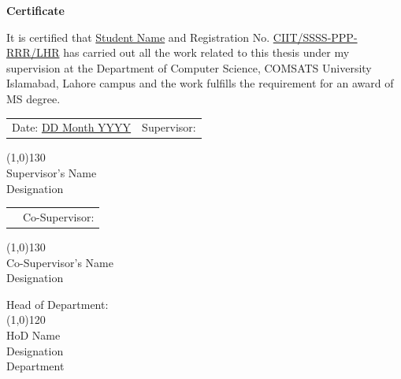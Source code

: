 \begin{titlepage}
\begin{center}
	\vspace{1cm }
	\textbf{\large Certificate}\\
\end{center}
\justify
It is certified that \underline{Student Name} and Registration No. \underline{CIIT/SSSS-PPP-RRR/LHR} has
carried out all the work related to this thesis under my supervision at the Department of Computer Science, COMSATS University Islamabad, Lahore campus and the work fulfills the requirement for an award of MS degree.\\

\vspace{1cm}
\begin{table}[ht!]
	\begin{tabularx}{\textwidth}{p{10cm} p{6cm}}
		Date: \underline{DD Month YYYY} & Supervisor: \\
	\end{tabularx}
\end{table}


\vspace{1cm }
\raggedleft \line(1,0){130} \\
\vspace{0.1cm }
\raggedleft Supervisor's Name \\
\raggedleft Designation \\

\vspace{1cm }
\begin{table}[ht!]
	\begin{tabularx}{\textwidth}{p{10cm} p{6cm}}
		& Co-Supervisor: \\
	\end{tabularx}
\end{table}
\vspace{1cm }
\raggedleft \line(1,0){130} \\
\vspace{0.1cm }
\raggedleft Co-Supervisor's Name \\ 
Designation\\

\raggedright
\vspace{1.5cm }
Head of Department:\\
\vspace{1.5cm }
\line(1,0){120} \\
\vspace{0.1cm }
HoD Name \\ 
Designation\\
Department
\pagebreak



\end{titlepage}
